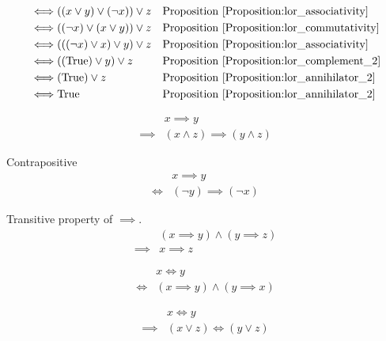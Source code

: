 \begin{prop}
\begin{align*}
\iff & ((x \lor y) \lor (\lnot x)) \lor z
&& \text{Proposition \ref{Proposition:lor_associativity}} \\
\iff & ((\lnot x) \lor (x \lor y)) \lor z
&& \text{Proposition \ref{Proposition:lor_commutativity}} \\
\iff & (((\lnot x) \lor x) \lor y) \lor z
&& \text{Proposition \ref{Proposition:lor_associativity}} \\
\iff & ((\text{True}) \lor y) \lor z
&& \text{Proposition \ref{Proposition:lor_complement_2}} \\
\iff & (\text{True}) \lor z
&& \text{Proposition \ref{Proposition:lor_annihilator_2}} \\
\iff & \text{True}
&& \text{Proposition \ref{Proposition:lor_annihilator_2}} \\
\end{align*}
\end{prop}

\begin{prop}
\label{Proposition:implies_land}
\begin{align*}
& x \implies y \\
\implies & (x \land z) \implies (y \land z)
\end{align*}
\end{prop}

\begin{prop}
\label{Proposition:contrapositive}
Contrapositive
\begin{align*}
& x \implies y \\
\iff & (\lnot y) \implies (\lnot x)
\end{align*}
\end{prop}

\begin{prop}
\label{Proposition:implies_transitive}
Transitive property of $\implies$.
\begin{align*}
& (x \implies y) \land (y \implies z) \\
\implies & x \implies z
\end{align*}
\end{prop}

\begin{prop}
\label{Proposition:iff_implies}
\begin{align*}
& x \iff y \\
\iff & (x \implies y) \land (y \implies x)
\end{align*}
\end{prop}

\begin{prop}
\label{Proposition:iff_lor}
\begin{align*}
& x \iff y \\
\implies & (x \lor z) \iff (y \lor z)
\end{align*}
\end{prop}

